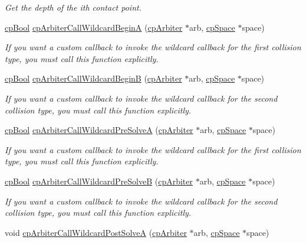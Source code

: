 \begin{DoxyCompactItemize}
\begin{DoxyCompactList}\small\item\em Get the depth of the {\ttfamily ith} contact point. \end{DoxyCompactList}\item 
\hyperlink{group__basic_types_gabc5e752c48f3449ca26ef413ecbd647e}{cp\+Bool} \hyperlink{group__cp_arbiter_ga5eaf915d1119606a522fc543c2c6062f}{cp\+Arbiter\+Call\+Wildcard\+Begin\+A} (\hyperlink{structcp_arbiter}{cp\+Arbiter} $\ast$arb, \hyperlink{structcp_space}{cp\+Space} $\ast$space)
\begin{DoxyCompactList}\small\item\em If you want a custom callback to invoke the wildcard callback for the first collision type, you must call this function explicitly. \end{DoxyCompactList}\item 
\hyperlink{group__basic_types_gabc5e752c48f3449ca26ef413ecbd647e}{cp\+Bool} \hyperlink{group__cp_arbiter_ga33a591416326fd52fd768e183a84677d}{cp\+Arbiter\+Call\+Wildcard\+Begin\+B} (\hyperlink{structcp_arbiter}{cp\+Arbiter} $\ast$arb, \hyperlink{structcp_space}{cp\+Space} $\ast$space)
\begin{DoxyCompactList}\small\item\em If you want a custom callback to invoke the wildcard callback for the second collision type, you must call this function explicitly. \end{DoxyCompactList}\item 
\hyperlink{group__basic_types_gabc5e752c48f3449ca26ef413ecbd647e}{cp\+Bool} \hyperlink{group__cp_arbiter_gaa6f7421e10cd0f98bb0282d246fb7f7e}{cp\+Arbiter\+Call\+Wildcard\+Pre\+Solve\+A} (\hyperlink{structcp_arbiter}{cp\+Arbiter} $\ast$arb, \hyperlink{structcp_space}{cp\+Space} $\ast$space)
\begin{DoxyCompactList}\small\item\em If you want a custom callback to invoke the wildcard callback for the first collision type, you must call this function explicitly. \end{DoxyCompactList}\item 
\hyperlink{group__basic_types_gabc5e752c48f3449ca26ef413ecbd647e}{cp\+Bool} \hyperlink{group__cp_arbiter_gac6f3f8d7b3628c7c9a0751ebebf1e3f3}{cp\+Arbiter\+Call\+Wildcard\+Pre\+Solve\+B} (\hyperlink{structcp_arbiter}{cp\+Arbiter} $\ast$arb, \hyperlink{structcp_space}{cp\+Space} $\ast$space)
\begin{DoxyCompactList}\small\item\em If you want a custom callback to invoke the wildcard callback for the second collision type, you must call this function explicitly. \end{DoxyCompactList}\item 
\hypertarget{group__cp_arbiter_ga4a9b472b93005949f5830b9c7fd3e830}{}void \hyperlink{group__cp_arbiter_ga4a9b472b93005949f5830b9c7fd3e830}{cp\+Arbiter\+Call\+Wildcard\+Post\+Solve\+A} (\hyperlink{structcp_arbiter}{cp\+Arbiter} $\ast$arb, \hyperlink{structcp_space}{cp\+Space} $\ast$space)\label{group__cp_arbiter_ga4a9b472b93005949f5830b9c7fd3e830}


\end{DoxyCompactItemize}
